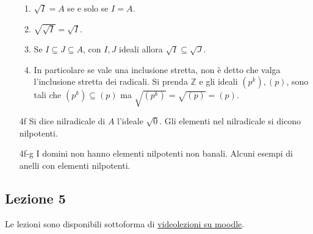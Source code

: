 \documentclass[italian]{article}
\begin{document}
\begin{enumerate}
\begin{enumerate}
          \item $\sqrt{I} = A$ se e solo se $I = A$.
          \item $\sqrt{\sqrt{I}} = \sqrt{I}$.
          \item Se $I \subseteq J \subseteq A$, con $I,J$ ideali allora
            $\sqrt{I} \subseteq \sqrt{J}$.
          \item In particolare se vale una inclusione stretta, non è detto che
            valga l'inclusione stretta dei radicali. Si prenda $\mathbb{Z}$
            e gli ideali $(p^k), (p)$, sono tali che $(p^k) \subseteq (p)$ ma
            $\sqrt{(p^k)} = \sqrt{(p)} = (p)$.
        \end{enumerate}
       \item[4f] Si dice nilradicale di $A$ l'ideale $\sqrt{0}$. Gli elementi
         nel nilradicale si dicono nilpotenti.
       \item[4f-g] I domini non hanno elementi nilpotenti non banali. Alcuni
         esempi di anelli con elementi nilpotenti. 
    \end{enumerate}

    
    \subsection{Lezione 5}

    Le lezioni sono disponibili sottoforma di 
    \href{https://didatticaonline.unitn.it/dol/course/view.php?id=23268}{videolezioni
    su moodle}.
    
\end{document}
